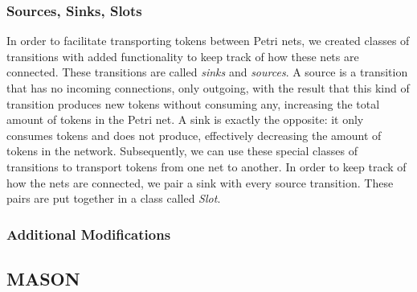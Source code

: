 \documentclass[11pt]{article}
\begin{document}
\subsubsection{Sources, Sinks, Slots}
In order to facilitate transporting tokens between Petri nets, we created classes of transitions with added functionality to keep track of how these nets are connected. These transitions are called \emph{sinks} and \emph{sources}. A source is a transition that has no incoming connections, only outgoing, with the result that this kind of transition produces new tokens without consuming any, increasing the total amount of tokens in the Petri net. A sink is exactly the opposite: it only consumes tokens and does not produce, effectively decreasing the amount of tokens in the network. Subsequently, we can use these special classes of transitions to transport tokens from one net to another. In order to keep track of how the nets are connected, we pair a sink with every source transition. These pairs are put together in a class called \emph{Slot}.

\subsubsection{Additional Modifications}


\subsection{MASON}





\end{document}
